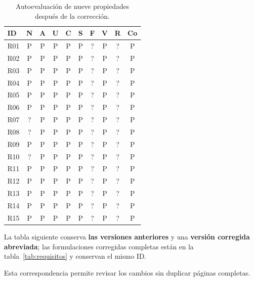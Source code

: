 \documentclass[12pt,a4paper]{article}
\begin{document}
\begin{table}[H]
\centering

\caption{
Autoevaluación de nueve propiedades después de la corrección.
}
\label{tab:autoeval}

\begin{tabular}{|l|*{9}{c|}}
\hline

ID & N & A & U & C & S & F & V & R & Co\\
\hline

R01&P&P&P&P&P&?&P&?&P\\
\hline
R02&P&P&P&P&P&?&P&?&P\\
\hline
R03&P&P&P&P&P&?&P&?&P\\
\hline
R04&P&P&P&P&P&?&P&?&P\\
\hline
R05&P&P&P&P&P&?&P&?&P\\
\hline
R06&P&P&P&P&P&?&P&?&P\\
\hline
R07&?&P&P&P&P&?&P&?&P\\
\hline
R08&?&P&P&P&P&?&P&?&P\\
\hline
R09&P&P&P&P&P&?&P&?&P\\
\hline
R10&?&P&P&P&P&?&P&?&P\\
\hline
R11&P&P&P&P&P&?&P&?&P\\
\hline
R12&P&P&P&P&P&?&P&?&P\\
\hline
R13&P&P&P&P&P&?&P&?&P\\
\hline
R14&P&P&P&P&P&?&P&?&P\\
\hline
R15&P&P&P&P&P&?&P&?&P\\
\hline

\end{tabular}
\end{table}
\endgroup

La tabla siguiente conserva \textbf{las versiones anteriores} y una \textbf{versión corregida abreviada}; las formulaciones corregidas completas están en la tabla~\ref{tab:requisitos} y conservan el mismo ID.

Esta correspondencia permite revisar los cambios sin duplicar páginas completas.

\begingroup
\footnotesize
\renewcommand{\arraystretch}{1.05}
\end{document}
